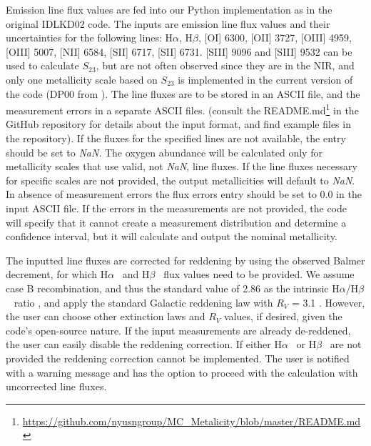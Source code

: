 \documentclass{emulateapj}
\newcommand{\ha}{H$\alpha$}
\newcommand{\hb}{H$\beta$}
\begin{document}
Emission line flux values are fed into our Python implementation as in the original IDLKD02 code. The inputs are emission line flux values and their uncertainties for the following lines: \ha, \hb, [OI] 6300, [OII] 3727, [OIII] 4959, [OIII] 5007, [NII] 6584, [SII] 6717, [SII] 6731.  [SIII] 9096 and [SIII] 9532 can be used to calculate $S_{23}$, but are not often observed since they are in the NIR, and only one metallicity scale  based on $S_{23}$ is implemented in the current version of the code (DP00 from \citealt{diaz00}). The line fluxes are to be stored in an ASCII file, and the measurement errors in a separate ASCII files.
(consult the README.md\footnote{\url{https://github.com/nyusngroup/MC_Metalicity/blob/master/README.md}} in the GitHub repository for details about the input format, and find example files in the repository). 
 If the fluxes for the specified lines are not available, the entry should be set to \emph{NaN}. The oxygen abundance will be calculated only for metallicity scales that use valid, not \emph{NaN}, line fluxes. 
If the line fluxes necessary for specific scales are not provided, the output metallicities will default to \emph{NaN}. In absence of measurement errors the flux errors entry should be set to 0.0 in the input ASCII file. If the errors in the measurements are not provided, the code will specify that it cannot create a measurement distribution and determine a confidence interval, but it will calculate and output the nominal metallicity.

The inputted line fluxes are corrected for reddening by using the observed Balmer decrement, for which \ha~ and  \hb~ flux values need to be provided. We assume case B recombination, and thus the standard value of 2.86 as the
intrinsic \ha/\hb~ ratio \citep{osterbrock89}, and apply the standard Galactic reddening law with $R_V$ = 3.1 \citep{cardelli89}. However, the user can choose other extinction laws and $R_V$ values, if desired, given the code's open-source nature. If the input measurements are already de-reddened, the user can easily disable the reddening correction. If either \ha~ or \hb~ are not provided the reddening correction cannot be implemented. The user is notified with a warning message and has the option to proceed with the calculation with uncorrected line fluxes.
\end{document}
